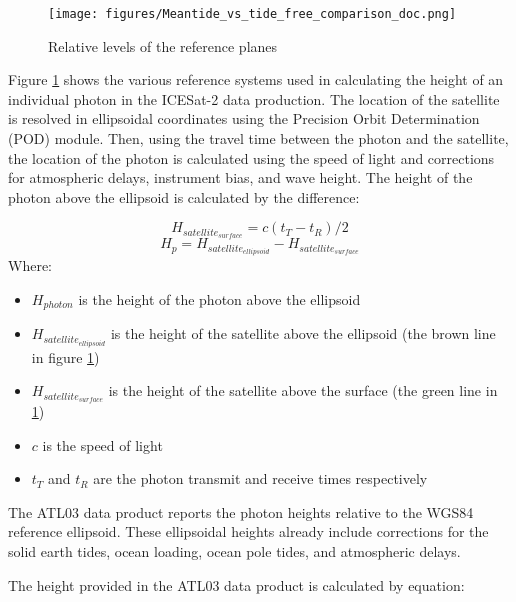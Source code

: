 \begin{figure}[h]
      \centering
      \texttt{[image: figures/Meantide\_vs\_tide\_free\_comparison\_doc.png]}
      \caption{Relative levels of the reference planes}
      \label{fig:geoids-ellipsoids-graphics}
\end{figure}

Figure \ref{fig:geoids-ellipsoids-graphics} shows the various reference systems used in calculating the height of an individual photon in the ICESat-2 data production. The location of the satellite is resolved in ellipsoidal coordinates using the Precision Orbit Determination (POD) module. Then, using the travel time between the photon and the satellite, the location of the photon is calculated using the speed of light and corrections for atmospheric delays, instrument bias, and wave height. The height of the photon above the ellipsoid is calculated by the difference:


\begin{equation}\label{eq:raw_photon_calculation}
      H_{satellite_{surface}} = c(t_T-t_R)/2
\end{equation}
\begin{equation}
      H_p = H_{satellite_{ellipsoid}} - H_{satellite_{surface}}
\end{equation}
Where:
\begin{itemize}
      \item $H_{photon}$ is the height of the photon above the ellipsoid
      \item $H_{satellite_{ellipsoid}}$ is the height of the satellite above the ellipsoid (the brown line in figure \ref{fig:geoids-ellipsoids-graphics})
      \item $H_{satellite_{surface}}$ is the height of the satellite above the surface (the green line in \ref{fig:geoids-ellipsoids-graphics})
      \item $c$ is the speed of light
      \item $t_T$ and $t_R$ are the photon transmit and receive times respectively
\end{itemize}

The ATL03 data product reports the photon heights relative to the WGS84 reference ellipsoid. These ellipsoidal heights already include corrections for the solid earth tides, ocean loading, ocean pole tides, and atmospheric delays.

The height provided in the ATL03 data product is calculated by equation:

